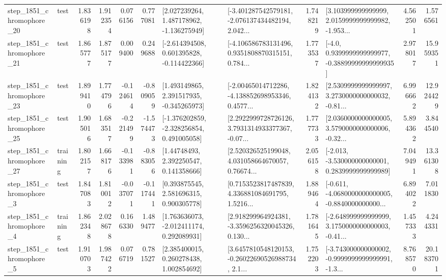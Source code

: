 \begin{tabular}{llrrrrllrlrr}
 step\_1851\_chromophore\_20 &      test &      1.836198 &    1.912354 &      0.076156 &  0.777081 &    [2.027239264, 1.487178962, -1.136275949] &  [-3.401287542579181, -2.076137434482194, 2.042... &       1.748219 &  [3.103999999999999, 2.0159999999999982, -1.953... &            4.562501 &          1.576561 \\
 step\_1851\_chromophore\_21 &      test &      1.865777 &    1.875177 &      0.009400 &  0.249688 &   [-2.614394508, 0.601395828, -0.114422366] &  [-4.106586783131496, 0.9351808870315151, 0.784... &       1.773537 &   [-4.0, 0.9399999999999977, -0.38899999999999935] &            2.978017 &         15.959351 \\
 step\_1851\_chromophore\_23 &      test &      1.899410 &    1.774796 &     -0.124614 & -0.809059 &    [1.493149865, 2.391517935, -0.345265973] &  [-2.00465014712286, -4.138852698953346, 0.4577... &       1.824132 &  [2.5309999999999997, 3.2730000000000032, -0.81... &            6.996662 &         12.924429 \\
 step\_1851\_chromophore\_25 &      test &      1.905016 &    1.683517 &     -0.221499 & -1.574473 &   [-1.376202859, -2.328256854, 0.491005058] &  [2.2922999728726126, 3.7931314933377367, -0.07... &       1.777733 &  [2.0360000000000005, 3.5790000000000006, -0.32... &            5.894362 &          3.844540 \\
 step\_1851\_chromophore\_27 &  training &      1.802157 &    1.668176 &     -0.133981 & -0.883056 &      [1.44748493, 2.392250547, 0.141358666] &  [2.520326525199048, 4.031058664670057, 0.76674... &       2.056158 &   [-2.013, -3.530000000000001, 0.2839999999999989] &            7.049491 &         13.361308 \\
  step\_1851\_chromophore\_3 &      test &      1.847083 &    1.810012 &     -0.037071 & -0.117441 &     [0.393875545, 2.581696315, 0.900305778] &  [0.7153523817487839, 4.336881084691795, 1.5216... &       1.889464 &  [-0.611, -4.0680000000000005, -0.8840000000000... &            6.894022 &          7.011830 \\
  step\_1851\_chromophore\_4 &  training &      1.862348 &    2.028678 &      0.166330 &  1.489477 &    [1.763636073, -2.012411174, 0.292089931] &  [2.918299964924381, -3.3596256320045326, 0.130... &       1.781645 &  [-2.648999999999999, 3.1750000000000003, -0.41... &            1.457333 &          4.244331 \\
  step\_1851\_chromophore\_5 &      test &      1.910703 &    1.987422 &      0.076719 &  0.781527 &     [2.385400015, 0.260278438, 1.002854692] &  [3.6457810548120153, -0.26022690526988734, 2.1... &       1.752203 &  [-3.743000000000002, -0.9999999999999991, -1.3... &            8.768570 &         20.183701 \\

\end{tabular}
